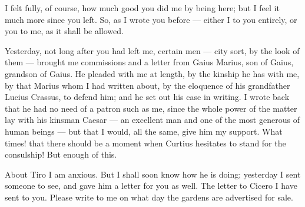 

 I felt fully, of course, how much good you did me by being here; but I feel it much more since you left. So, as I wrote you before --- either I to you entirely, or you to me, as it shall be allowed.

 Yesterday, not long after you had left me, certain men --- city sort, by the look of them --- brought me commissions and a letter from Gaius Marius, son of Gaius, grandson of Gaius. He pleaded with me at length, by the kinship he has with me, by that Marius whom I had written about, by the eloquence of his grandfather Lucius Crassus, to defend him; and he set out his case in writing. I wrote back that he had no need of a patron such as me, since the whole power of the matter lay with his kinsman Caesar --- an excellent man and one of the most generous of human beings --- but that I would, all the same, give him my support. What times! that there should be a moment when Curtius hesitates to stand for the consulship! But enough of this.

 About Tiro I am anxious. But I shall soon know how he is doing; yesterday I sent someone to see, and gave him a letter for you as well. The letter to Cicero I have sent to you. Please write to me on what day the gardens are advertised for sale.
